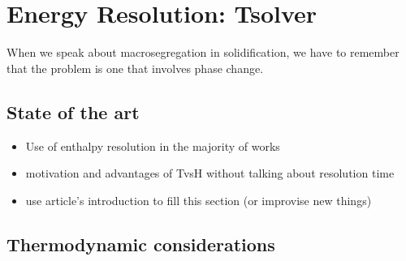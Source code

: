 \chapter{Energy Resolution: Tsolver}
\minitoc
\newpage


When we speak about macrosegregation in solidification, we have to remember that the problem is one that involves phase change.


\section{State of the art}
\begin{itemize}
\item Use of enthalpy resolution in the majority of works 
\item motivation and advantages of TvsH without talking about resolution time
\item use article's introduction to fill this section (or improvise new things)
\end{itemize}


\section{Thermodynamic considerations}

